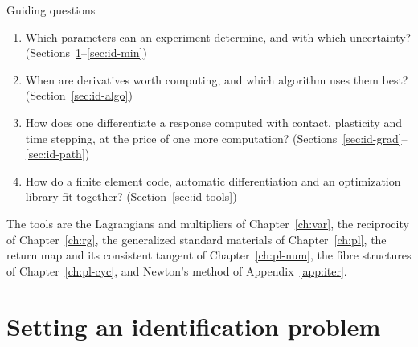 \begin{gbox}{Guiding questions}
\begin{enumerate}[itemsep=1pt]
  \item Which parameters can an experiment determine, and with which
  uncertainty? (Sections~\ref{sec:id-settings}--\ref{sec:id-min})
  \item When are derivatives worth computing, and which algorithm uses them
  best? (Section~\ref{sec:id-algo})
  \item How does one differentiate a response computed with contact, plasticity
  and time stepping, at the price of one more computation?
  (Sections~\ref{sec:id-grad}--\ref{sec:id-path})
  \item How do a finite element code, automatic differentiation and an
  optimization library fit together? (Section~\ref{sec:id-tools})
\end{enumerate}
The tools are the Lagrangians and multipliers of Chapter~\ref{ch:var}, the
reciprocity of Chapter~\ref{ch:rg}, the generalized standard materials of
Chapter~\ref{ch:pl}, the return map and its consistent tangent of
Chapter~\ref{ch:pl-num}, the fibre structures of Chapter~\ref{ch:pl-cyc}, and
Newton's method of Appendix~\ref{app:iter}.
\end{gbox}

\section{Setting an identification problem}\label{sec:id-settings}
%

